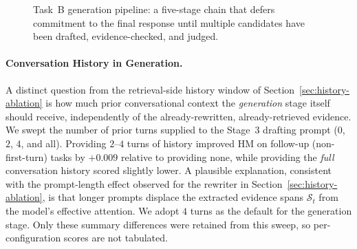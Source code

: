 \begin{figure}[h]
\centering
{}
\caption{Task~B generation pipeline: a five-stage chain that defers commitment to the final response until multiple candidates have been drafted, evidence-checked, and judged.}
\label{fig:taskB-en}
\end{figure}

\paragraph{Conversation History in Generation.}
\label{sec:gen-history}
A distinct question from the retrieval-side history window of Section~\ref{sec:history-ablation} is
how much prior conversational context the \emph{generation} stage itself should receive, independently
of the already-rewritten, already-retrieved evidence. We swept the number of prior turns supplied to the Stage~3 drafting prompt ($0$, $2$, $4$, and all).
Providing $2$--$4$ turns of history improved HM on follow-up (non-first-turn) tasks by $+0.009$ relative
to providing none, while providing the \emph{full} conversation history scored slightly lower. A plausible
explanation, consistent with the prompt-length effect observed for the rewriter in
Section~\ref{sec:history-ablation}, is that longer prompts displace the extracted evidence spans $\mathcal{S}_t$
from the model's effective attention. We adopt $4$ turns as the default for the generation stage. Only these
summary differences were retained from this sweep, so per-configuration scores are not tabulated.

